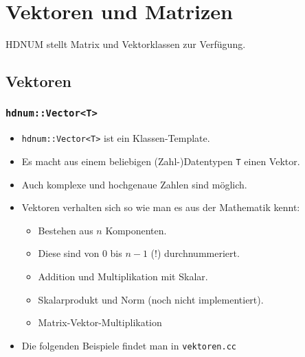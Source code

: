 \section{Vektoren und Matrizen}


HDNUM stellt Matrix und Vektorklassen zur Verfügung.
\subsection{Vektoren}

\begin{frame}[fragile]
\frametitle{\lstinline{hdnum::Vector<T>}}
\begin{itemize}
\item \lstinline{hdnum::Vector<T>} ist ein Klassen-Template.
\item Es macht aus einem beliebigen (Zahl-)Datentypen \lstinline{T}
  einen Vektor.
\item Auch komplexe und hochgenaue Zahlen sind möglich.
\item Vektoren verhalten sich so wie man es aus der Mathematik kennt:
\begin{itemize}
\item Bestehen aus $n$ Komponenten.
\item Diese sind von $0$ bis $n-1$ (!) durchnummeriert.
\item Addition und Multiplikation mit Skalar.
\item Skalarprodukt und Norm (noch nicht implementiert).
\item Matrix-Vektor-Multiplikation
\end{itemize}
\item Die folgenden Beispiele findet man in \lstinline{vektoren.cc}
\end{itemize}
\end{frame}

